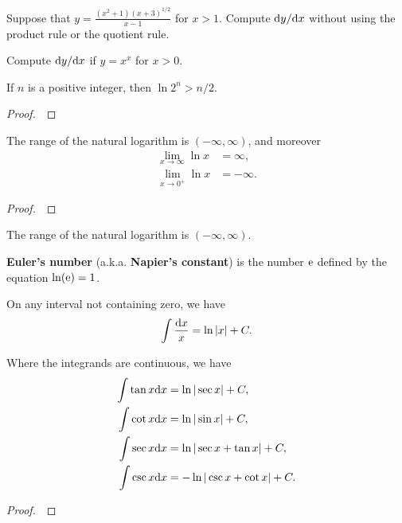 \begin{example}
Suppose that $y = \frac{(x^2+1)(x+3)^{1/2}}{x-1}$ for $x>1$.
Compute $\mathrm{d} y/\mathrm{d} x$ without using the product rule or the quotient rule.
\end{example}

\vfill

\begin{example}
Compute $\mathrm{d} y/\mathrm{d} x$ if $y=x^x$ for $x>0$.
\end{example}

\vfill

\newpage

\begin{theorem}
If $n$ is a positive integer, then $\ln 2^n > n/2$.
\end{theorem}
\begin{proof}\,

\vspace{2.5in}
\end{proof}

\begin{corollary}
The range of the natural logarithm is $(-\infty, \infty)$, and moreover
\begin{align*}
\lim_{x\to \infty}\ln x &= \infty,\\
\lim_{x\to 0^+}\ln x &=-\infty.
\end{align*}
\end{corollary}
\begin{proof}\,

\vspace{2.5in}
\end{proof}

\begin{corollary}
The range of the natural logarithm is $(-\infty,\infty)$.
\end{corollary}

\begin{definition}
\textbf{Euler's number} (a.k.a. \textbf{Napier's constant}) is the number $\mathrm{e}$ defined by the equation $\ln(\mathrm{e})=1$.
\end{definition}

\newpage

\begin{theorem}
On any interval not containing zero, we have
\begin{equation*}
\int\frac{\mathrm{d} x}{x} = \ln|x| + C.
\end{equation*}
\end{theorem}

\begin{corollary}
Where the integrands are continuous, we have
\begin{align}
\int\tan x \mathrm{d} x &= \ln |\sec x| + C,\\
\int\cot x \mathrm{d} x &= \ln|\sin x| + C,\\
\int\sec x \mathrm{d} x &=\ln |\sec x + \tan x| + C,\\
\int\csc x \mathrm{d} x &= -\ln |\csc x + \cot x| + C.
\end{align}
\end{corollary}
\begin{proof}\,

\vspace{5in}
\end{proof}
